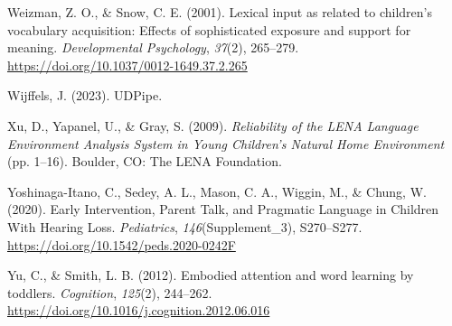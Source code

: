 \documentclass[
  man]{apa6}
\newlength{\cslhangindent}
\newlength{\cslentryspacingunit} %
\newenvironment{CSLReferences}[2] %
 {%
  \setlength{\parindent}{0pt}
  \ifodd #1
  \let\oldpar\par
  \def\par{\hangindent=\cslhangindent\oldpar}
  \fi
  \setlength{\parskip}{#2\cslentryspacingunit}
 }%
 {}
\begin{document}
\begin{CSLReferences}{1}{0}
\leavevmode{}%
Weizman, Z. O., \& Snow, C. E. (2001). Lexical input as related to children's vocabulary acquisition: Effects of sophisticated exposure and support for meaning. \emph{Developmental Psychology}, \emph{37}(2), 265--279. \url{https://doi.org/10.1037/0012-1649.37.2.265}

\leavevmode{}%
Wijffels, J. (2023). {UDPipe}.

\leavevmode{}%
Xu, D., Yapanel, U., \& Gray, S. (2009). \emph{Reliability of the {LENA Language Environment Analysis System} in {Young Children}'s {Natural Home Environment}} (pp. 1--16). {Boulder, CO}: {The LENA Foundation}.

\leavevmode{}%
Yoshinaga-Itano, C., Sedey, A. L., Mason, C. A., Wiggin, M., \& Chung, W. (2020). Early {Intervention}, {Parent Talk}, and {Pragmatic Language} in {Children With Hearing Loss}. \emph{Pediatrics}, \emph{146}(Supplement\_3), S270--S277. \url{https://doi.org/10.1542/peds.2020-0242F}

\leavevmode{}%
Yu, C., \& Smith, L. B. (2012). Embodied attention and word learning by toddlers. \emph{Cognition}, \emph{125}(2), 244--262. \url{https://doi.org/10.1016/j.cognition.2012.06.016}

\end{CSLReferences}
\end{document}
